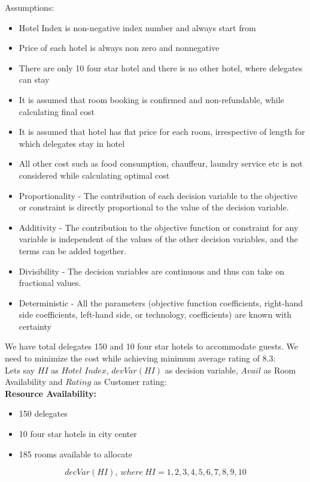 \documentclass[paper=a4, fontsize=11pt]{scrartcl} %
\begin{document}
Assumptions:
\begin{itemize}
\item Hotel Index is non-negative index number and always start from 
\item Price of each hotel is always non \- zero and non\-negative 
\item There are only 10 four star hotel and there is no other hotel, where delegates can stay
\item It is assumed that room booking is confirmed and non-refundable, while calculating final cost
\item It is assumed that hotel has flat price for each room, irrespective of length for which delegates stay in hotel
\item All other cost such as food consumption, chauffeur, laundry service etc is not considered while calculating optimal cost


\item Proportionality - The contribution of each decision variable
to the objective or constraint is directly proportional to the
value of the decision variable.
\item Additivity - The contribution to the objective function or
constraint for any variable is independent of the values of the
other decision variables, and the terms can be added together.
\item Divisibility - The decision variables are continuous and thus
can take on fractional values.
\item Deterministic - All the parameters (objective function
coefficients, right-hand side coefficients, left-hand side, or
technology, coefficients) are known with certainty
\end{itemize}

We have total delegates 150 and 10 four star hotels to accommodate guests. We need to minimize the cost while achieving minimum average rating of 8.3:\\

Lets say $HI$ as $Hotel$ $Index$, $devVar(HI)$ as decision variable, $Avail$ as Room Availability and $Rating$ as Customer rating:\\

\textbf{Resource Availability:}
\begin{itemize}
\item 150 delegates
\item 10 four star hotels in city center
\item 185 rooms available to allocate
\end{itemize}
\begin{equation}
decVar(HI) ,\ where\ HI = 1,2,3,4,5,6,7,8,9,10
\end{equation}
\end{document}
